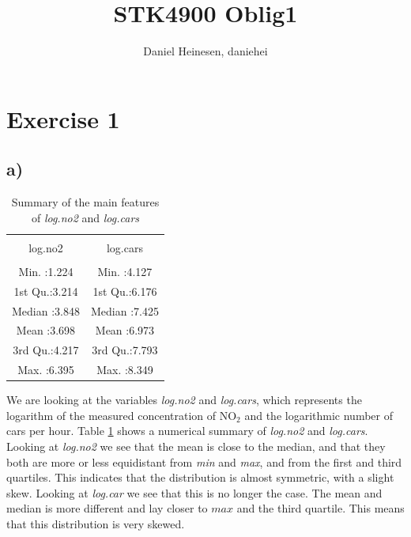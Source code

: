 \documentclass[a4paper,norsk, 10pt]{article}
\title{STK4900 Oblig1}
\author{Daniel Heinesen, daniehei}
\begin{document}
\maketitle




\section*{Exercise 1}



\subsection*{a)}
\begin{table}[ht]
\centering
\begin{tabular}{cc}
\\[-1.8ex]\hline 
\hline \\[-1.8ex]
log.no2 &    log.cars  \\ 
\hline \\[-1.8ex] 
Min.   :1.224   & Min.   :4.127  \\ 
1st Qu.:3.214   & 1st Qu.:6.176  \\ 
Median :3.848   & Median :7.425   \\ 
Mean   :3.698   & Mean   :6.973   \\ 
3rd Qu.:4.217   & 3rd Qu.:7.793   \\ 
Max.   :6.395   & Max.   :8.349     \\ 
   \hline
\end{tabular}
\caption{Summary of the main features of \textit{log.no2} and \textit{log.cars}}\label{tab:sum_no2_cars}
\end{table}



We are looking at the variables \textit{log.no2} and \textit{log.cars}, which represents the logarithm of the measured concentration of NO$_{2}$ and the logarithmic number of cars per hour. Table \ref{tab:sum_no2_cars} shows a numerical summary of \textit{log.no2} and \textit{log.cars}. Looking at \textit{log.no2} we see that the mean is close to the median, and that they both are more or less equidistant from \textit{min} and \textit{max}, and from the first and third quartiles. This indicates that the distribution is almost symmetric, with a slight skew. Looking at \textit{log.car} we see that this is no longer the case. The mean and median is more different and lay closer to $max$ and the third quartile. This means that this distribution is very skewed.
\end{document}

